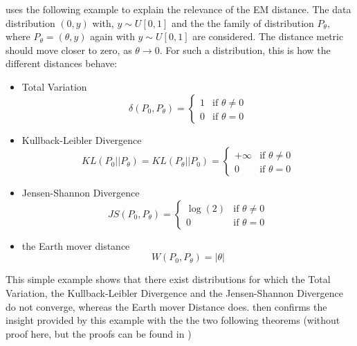 \documentclass[11pt,a4paper,twoside]{report}
\begin{document}
\cite{arjovsky2017wasserstein} uses the following example to explain the relevance of the EM distance. The data distribution $(0, y)$ with, $y \sim U[0,1]$ and the the family of distribution $P_{\theta}$, where $P_{\theta} = (\theta, y)$ again with $y \sim U[0,1]$ are considered. The distance metric should move closer to zero, as $\theta \rightarrow 0$. For such a distribution, this is how the different distances behave:

\begin{itemize}
    \item Total Variation
    \begin{equation}
        \delta(P_0, P_{\theta}) = 
        \begin{cases}
            1 & \text{if } \theta \neq 0\\
            0 & \text{if } \theta = 0
        \end{cases}
    \end{equation}
    \item Kullback-Leibler Divergence
    \begin{equation}
        KL(P_0 || P_{\theta}) = KL(P_{\theta} || P_0) =
        \begin{cases}
            +\infty & \text{if } \theta \neq 0\\
            0 & \text{if } \theta = 0
        \end{cases}
    \end{equation}
    \item Jensen-Shannon Divergence  
    \begin{equation}
        JS(P_0, P_{\theta}) = 
        \begin{cases}
            \log(2) & \text{if } \theta \neq 0\\
            0 & \text{if } \theta = 0
        \end{cases}
    \end{equation}
    \item the Earth mover distance
    \begin{equation}
        W(P_0, P_{\theta}) = |\theta|
    \end{equation}
\end{itemize}

This simple example shows that there exist distributions for which the Total Variation, the Kullback-Leibler Divergence and the Jensen-Shannon Divergence do not converge, whereas the Earth mover Distance does. \cite{arjovsky2017wasserstein} then confirms the insight provided by this example with the the two following theorems (without proof here, but the proofs can be found in \cite{arjovsky2017wasserstein})
\end{document}
